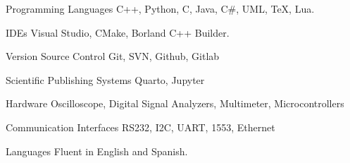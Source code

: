 
\begin{cvskills}

	\cvskill
		{Programming Languages}
			{C++, Python, C, Java, C\#, UML, \TeX, Lua.}

	\cvskill
		{IDEs}
			{Visual Studio, CMake, Borland C++ Builder.}

  \cvskill
    {Version Source Control}
      {Git, SVN, Github, Gitlab}

	\cvskill
		{Scientific Publishing Systems}
			{Quarto, Jupyter}

	\cvskill
		{Hardware}
			{Oscilloscope, Digital Signal Analyzers, Multimeter, Microcontrollers}

  \cvskill
    {Communication Interfaces}
      {RS232, I2C, UART, 1553, Ethernet}

	\cvskill
		{Languages}
			{Fluent in English and Spanish.}

\end{cvskills}
